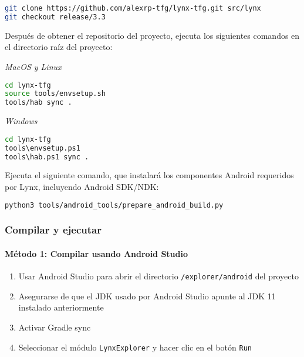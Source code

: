 \begin{lstlisting}[language=bash]
git clone https://github.com/alexrp-tfg/lynx-tfg.git src/lynx
git checkout release/3.3
\end{lstlisting}

Después de obtener el repositorio del proyecto, ejecuta los siguientes comandos en el directorio raíz del proyecto:

\textit{MacOS y Linux}
\begin{lstlisting}[language=bash]
cd lynx-tfg
source tools/envsetup.sh
tools/hab sync .
\end{lstlisting}

\textit{Windows}
\begin{lstlisting}[language=bash]
cd lynx-tfg
tools\envsetup.ps1
tools\hab.ps1 sync .
\end{lstlisting}

Ejecuta el siguiente comando, que instalará los componentes Android requeridos por Lynx, incluyendo Android SDK/NDK:
\begin{lstlisting}[language=bash]
python3 tools/android_tools/prepare_android_build.py
\end{lstlisting}

\subsubsection{Compilar y ejecutar}

\paragraph{Método 1: Compilar usando Android Studio}
\begin{enumerate}
    \item Usar Android Studio para abrir el directorio \texttt{/explorer/android} del proyecto
    \item Asegurarse de que el JDK usado por Android Studio apunte al JDK 11 instalado anteriormente
    \item Activar Gradle sync
    \item Seleccionar el módulo \texttt{LynxExplorer} y hacer clic en el botón \texttt{Run}
\end{enumerate}

